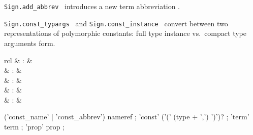 \begin{isabellebody}
\begin{isamarkuptext}
\begin{description}
  \item \verb|Sign.add_abbrev|~
  introduces a new term abbreviation .

  \item \verb|Sign.const_typargs|~ and \verb|Sign.const_instance|~
  convert between two representations of polymorphic constants: full
  type instance vs.\ compact type arguments form.

  \end{description}%
\end{isamarkuptext}%
\isamarkuptrue%
%
\endisatagmlref
{\isafoldmlref}%
%
\isadelimmlref
%
\endisadelimmlref
%
\isadelimmlantiq
%
\endisadelimmlantiq
%
\isatagmlantiq
%
\begin{isamarkuptext}%
\begin{matharray}{rcl}
  \hypertarget{ML antiquotation.const-name}{\hyperlink{ML antiquotation.const-name}{\mbox{}}} & : &  \\
  \hypertarget{ML antiquotation.const-abbrev}{\hyperlink{ML antiquotation.const-abbrev}{\mbox{}}} & : &  \\
  \hypertarget{ML antiquotation.const}{\hyperlink{ML antiquotation.const}{\mbox{}}} & : &  \\
  \hypertarget{ML antiquotation.term}{\hyperlink{ML antiquotation.term}{\mbox{}}} & : &  \\
  \hypertarget{ML antiquotation.prop}{\hyperlink{ML antiquotation.prop}{\mbox{}}} & : &  \\
  \end{matharray}

  \begin{rail}
  ('const\_name' | 'const\_abbrev') nameref
  ;
  'const' ('(' (type + ',') ')')?
  ;
  'term' term
  ;
  'prop' prop
  ;
  \end{rail}


\end{isamarkuptext}
\end{isabellebody}
